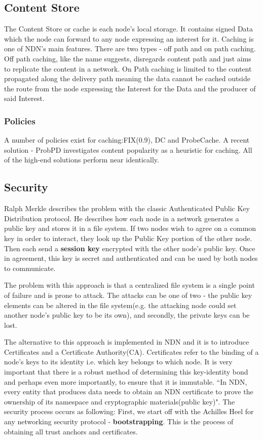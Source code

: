 \subsection{Content Store}
The Content Store or cache is each node's local storage. It contains signed Data which the node can forward to any node expressing an interest for it. Caching is one of NDN's main features. There are two types - off path and on path caching. Off path caching, like the name suggests, disregards content path and just aims to replicate the content in a network\cite{038}. On Path caching is limited to the content propagated along the delivery path\cite{039} meaning the data cannot be cached outside the route from the node expressing the Interest for the Data and the producer of said Interest.
\subsubsection{Policies}
A number of policies exist for caching:FIX(0.9), DC and ProbeCache. A recent solution - ProbPD investigates content popularity as a heuristic for caching. All of the high-end solutions perform near identically.
\subsection{Security}
Ralph Merkle describes the problem with the classic\cite{040} Authenticated Public Key Distribution protocol. He describes how each node in a network generates a public key and stores it in a file system. If two nodes wish to agree on a common key in order to interact, they look up the Public Key portion of the other node. Then each send a \textbf{session key} encrypted with the other node's public key. Once in agreement, this key is secret and authenticated and can be used by both nodes to communicate. 

The problem with this approach is that a centralized file system is a single point of failure and is prone to attack. The attacks can be one of two - the public key elements can be altered in the file system(e.g. the attacking node could set another node's public key to be its own), and secondly, the private keys can be lost.

 The alternative to this approach is implemented in NDN and it is to introduce Certificates and a Certificate Authority(CA). Certificates refer to the binding of a node's keys to its identity i.e. which key belongs to which node. It is very important that there is a robust method of determining this key-identity bond and perhaps even more importantly, to ensure that it is immutable. ``In NDN, every entity that produces data needs to obtain an NDN certificate to prove the ownership of its namespace and cryptographic materials(public key)"\cite{041}.
 The security process occurs as following: First, we start off with the Achilles Heel for any networking security protocol - \textbf{bootstrapping}. This is the process of obtaining all trust anchors and certificates. 
	 
